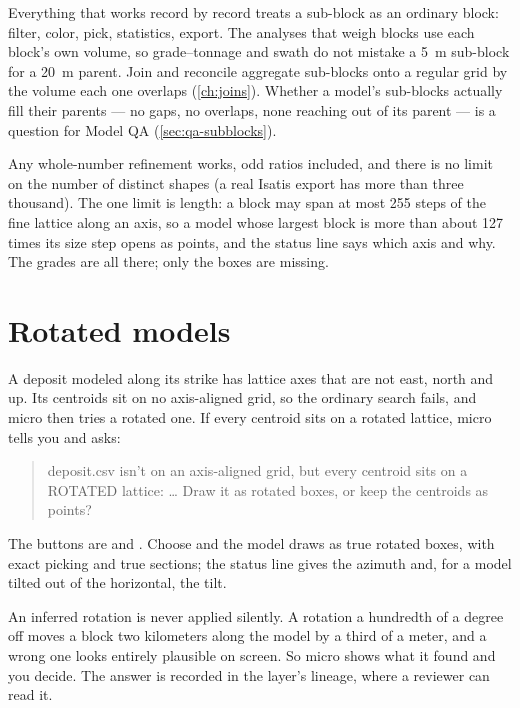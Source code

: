 Everything that works record by record treats a sub-block as an ordinary block: filter, color, pick, statistics, export. The analyses that weigh blocks use each block's own volume, so grade–tonnage and swath do not mistake a 5~m sub-block for a 20~m parent. Join and reconcile aggregate sub-blocks onto a regular grid by the volume each one overlaps (\cref{ch:joins}). Whether a model's sub-blocks actually fill their parents — no gaps, no overlaps, none reaching out of its parent — is a question for Model QA (\cref{sec:qa-subblocks}).

\begin{caution}
Any whole-number refinement works, odd ratios included, and there is no limit on the number of distinct shapes (a real Isatis export has more than three thousand). The one limit is length: a block may span at most 255 steps of the fine lattice along an axis, so a model whose largest block is more than about 127 times its size step opens as points, and the status line says which axis and why. The grades are all there; only the boxes are missing.
\end{caution}

\section{Rotated models}\label{sec:blocks-rotated}

A deposit modeled along its strike has lattice axes that are not east, north and up. Its centroids sit on no axis-aligned grid, so the ordinary search fails, and micro then tries a rotated one. If every centroid sits on a rotated lattice, micro tells you and asks:

\begin{quote}
\sffamily\small\color{ink}deposit.csv isn't on an axis-aligned grid, but every centroid sits on a ROTATED lattice: … Draw it as rotated boxes, or keep the centroids as points?
\end{quote}

The buttons are  and . Choose  and the model draws as true rotated boxes, with exact picking and true sections; the status line gives the azimuth and, for a model tilted out of the horizontal, the tilt.

\begin{why}
An inferred rotation is never applied silently. A rotation a hundredth of a degree off moves a block two kilometers along the model by a third of a meter, and a wrong one looks entirely plausible on screen. So micro shows what it found and you decide. The answer is recorded in the layer's lineage, where a reviewer can read it.
\end{why}

